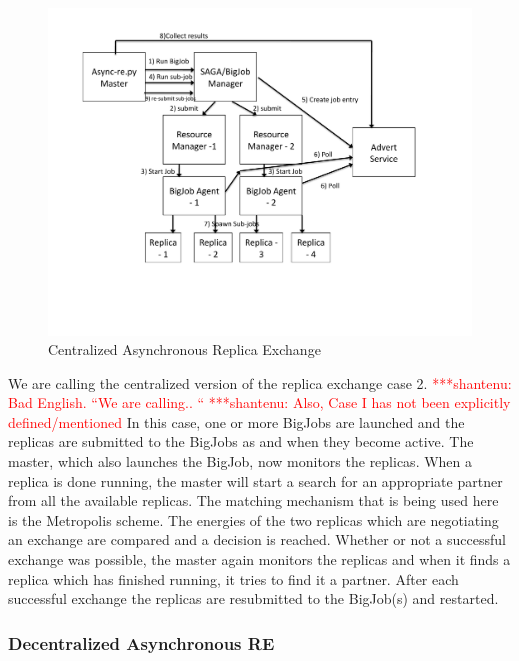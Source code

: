 \documentclass[a4paper,10pt]{article}
\newcommand{\jhanote}[1]{ {\textcolor{red} { ***shantenu: #1 }}}
\newcommand{\jhanote}[1]{}
\begin{document}
\begin{figure}
\centering
\includegraphics[scale=0.50]{figures/centralized_architecture}
\caption{\small Centralized Asynchronous Replica Exchange}
\label{fig:centralized}
\end{figure}

We are calling the centralized version of the replica exchange case
2. \jhanote{Bad English. ``We are calling.. ``} \jhanote{Also, Case I
  has not been explicitly defined/mentioned}
In this case, one or more BigJobs are launched and the replicas are
submitted to the BigJobs as and when they become active. The master,
which also launches the BigJob, now monitors the replicas. When a
replica is done running, the master will start a search for an
appropriate partner from all the available replicas. The matching
mechanism that is being used here is the Metropolis scheme. The
energies of the two replicas which are negotiating an exchange are
compared and a decision is reached.  Whether or not a successful
exchange was possible, the master again monitors the replicas and when
it finds a replica which has finished running, it tries to find it a
partner.  After each successful exchange the replicas are resubmitted
to the BigJob(s) and restarted.

\subsubsection{Decentralized Asynchronous RE}
\end{document}
